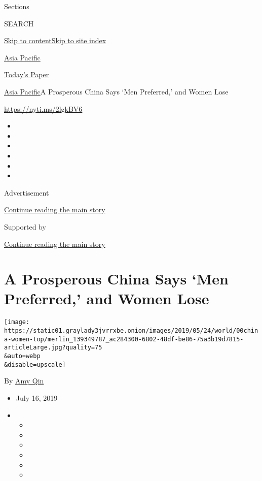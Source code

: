 Sections

SEARCH

\protect\hyperlink{site-content}{Skip to
content}\protect\hyperlink{site-index}{Skip to site index}

\href{https://www.nytimes3xbfgragh.onion/section/world/asia}{Asia
Pacific}

\href{https://myaccount.nytimes3xbfgragh.onion/auth/login?response_type=cookie\&client_id=vi}{}

\href{https://www.nytimes3xbfgragh.onion/section/todayspaper}{Today's
Paper}

\href{/section/world/asia}{Asia Pacific}\textbar{}A Prosperous China
Says `Men Preferred,' and Women Lose

\url{https://nyti.ms/2lgkBV6}

\begin{itemize}
\item
\item
\item
\item
\item
\item
\end{itemize}

Advertisement

\protect\hyperlink{after-top}{Continue reading the main story}

Supported by

\protect\hyperlink{after-sponsor}{Continue reading the main story}

\hypertarget{a-prosperous-china-says-men-preferred-and-women-lose}{%
\section{A Prosperous China Says `Men Preferred,' and Women
Lose}\label{a-prosperous-china-says-men-preferred-and-women-lose}}

\texttt{[image: https://static01.graylady3jvrrxbe.onion/images/2019/05/24/world/00china-women-top/merlin\_139349787\_ac284300-6802-48df-be86-75a3b19d7815-articleLarge.jpg?quality=75\\\&auto=webp\\\&disable=upscale]}

By \href{https://www.nytimes3xbfgragh.onion/by/amy-qin}{Amy Qin}

\begin{itemize}
\item
  July 16, 2019
\item
  \begin{itemize}
  \item
  \item
  \item
  \item
  \item
  \item
  \end{itemize}
\end{itemize}

